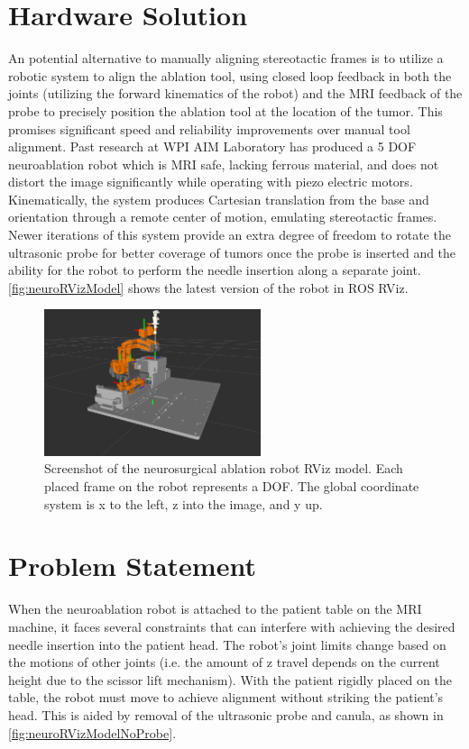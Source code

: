 \documentclass[12pt]{report}
\begin{document}
\section{Hardware Solution}
An potential alternative to manually aligning stereotactic frames is to utilize a robotic system to align the ablation tool, using closed loop feedback in both the joints (utilizing the forward kinematics of the robot) and the MRI feedback of the probe to precisely position the ablation tool at the location of the tumor. This promises significant speed and reliability improvements over manual tool alignment. Past research at WPI AIM Laboratory has produced a 5 DOF neuroablation robot which is MRI safe, lacking ferrous material, and does not distort the image significantly while operating with piezo electric motors. \cite{aimLabRobot} Kinematically, the system produces Cartesian translation from the base and orientation through a remote center of motion, emulating stereotactic frames. Newer iterations of this system provide an extra degree of freedom to rotate the ultrasonic probe for better coverage of tumors once the probe is inserted and the ability for the robot to perform the needle insertion along a separate joint. \autoref{fig:neuroRVizModel} shows the latest version of the robot in ROS RViz.

\begin{figure}[thpb]
	\centering
	\includegraphics[width = 2.5in]{images/neuro_rviz_model.png}
    \caption{Screenshot of the neurosurgical ablation robot RViz model. Each placed frame on the robot represents a DOF. The global coordinate system is x to the left, z into the image, and y up. }
    \label{fig:neuroRVizModel}
\end{figure}

\section{Problem Statement}
When the neuroablation robot is attached to the patient table on the MRI machine, it faces several constraints that can interfere with achieving the desired needle insertion into the patient head. The robot's joint limits change based on the motions of other joints (i.e. the amount of z travel depends on the current height due to the scissor lift mechanism). With the patient rigidly placed on the table, the robot must move to achieve alignment without striking the patient's head. This is aided by removal of the ultrasonic probe and canula, as shown in \autoref{fig:neuroRVizModelNoProbe}. 
\end{document}

